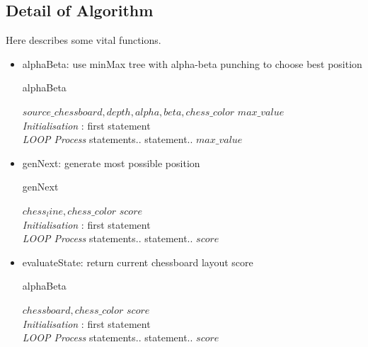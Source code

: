 \documentclass[conference,compsoc]{IEEEtran}
\renewcommand{\algorithmicrequire}{\textbf{Input:}}
\renewcommand{\algorithmicensure}{\textbf{Output:}}
\begin{document}
\subsection{Detail of Algorithm}
Here describes some vital functions.
\begin{itemize}
  \item alphaBeta: use minMax tree with alpha-beta punching to choose best position
    \begin{algorithm}[H]
     \caption{alphaBeta}
     \begin{algorithmic}[1]
     \renewcommand{\algorithmicrequire}{\textbf{Input:}}
     \renewcommand{\algorithmicensure}{\textbf{Output:}}
     \REQUIRE $source\_chessboard, depth, alpha, beta, chess\_color$
     \ENSURE  $max\_value$
     \\ \textit{Initialisation} :
     \STATE first statement
     \\ \textit{LOOP Process}
     \STATE statements..
     \STATE statement..
     \ENDIF
     \ENDFOR
     \RETURN $max\_value$
     \end{algorithmic}
   \end{algorithm}

   \item genNext: generate most possible position
     \begin{algorithm}[H]
     \caption{genNext}
     \begin{algorithmic}[2]
     \renewcommand{\algorithmicrequire}{\textbf{Input:}}
     \renewcommand{\algorithmicensure}{\textbf{Output:}}
     \REQUIRE $chess_line, chess\_color$
     \ENSURE  $score$
     \\ \textit{Initialisation} :
     \STATE first statement
     \\ \textit{LOOP Process}
     \STATE statements..
     \STATE statement..
     \ENDIF
     \ENDFOR
     \RETURN $score$
     \end{algorithmic}
     \end{algorithm}

  \item evaluateState: return current chessboard layout score
    \begin{algorithm}[H]
     \caption{alphaBeta}
     \begin{algorithmic}[3]
     \renewcommand{\algorithmicrequire}{\textbf{Input:}}
     \renewcommand{\algorithmicensure}{\textbf{Output:}}
     \REQUIRE $chessboard, chess\_color$
     \ENSURE  $score$
     \\ \textit{Initialisation} :
     \STATE first statement
     \\ \textit{LOOP Process}
     \STATE statements..
     \STATE statement..
     \ENDIF
     \ENDFOR
     \RETURN $score$
     \end{algorithmic}
     \end{algorithm}
 

\end{itemize}
\end{document}
